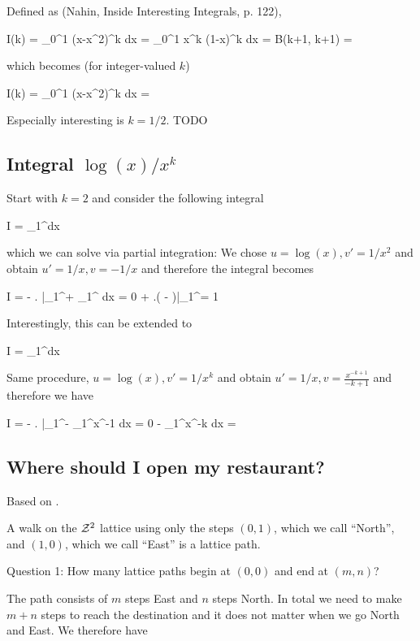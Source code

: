 Defined as (Nahin, Inside Interesting Integrals, p. 122),

\bee
I(k) = \int_0^1 (x-x^2)^k dx = \int_0^1 x^k (1-x)^k dx = B(k+1, k+1) = 
\eee

which becomes (for integer-valued $k$)

\bee
I(k) = \int_0^1 (x-x^2)^k dx = 
\eee

Especially interesting is $k =1/2$. TODO


\subsection{Integral $\log(x)/x^k$}

Start with $k = 2$ and consider the following integral

\bee
I = \int_1^\infty {}dx
\eee

which we can solve via partial integration: We chose $u=\log(x), v'=1/x^2$ and obtain $u' = 1/x, v = -1/x$ and therefore the integral becomes

\bee
I = - \left.  \right|_1^\infty + \int_1^\infty {} dx = 0 + \left.\left( -  \right)\right|_1^\infty = 1
\eee

Interestingly, this can be extended to

\bee
I = \int_1^\infty {}dx
\eee

Same procedure, $u=\log(x), v'=1/x^k$ and obtain $u' = 1/x, v = \frac{x^{-k+1}}{-k+1}$ and therefore we have

\bee
I = - \left.  \right|_1^\infty - \int_1^\infty x^{-1}  dx = 0 -  \int_1^\infty x^{-k} dx = 
\eee

\subsection{Where should I open my restaurant?}

Based on \cite{Kaplan2017}.

A walk on the $\mathcal{Z}^2$ lattice using only the steps $(0, 1)$, which we call ``North'', and $(1, 0)$, which we call ``East'' is a lattice path.

Question 1: How many lattice paths begin at $(0, 0)$ and end at $(m, n)$?

The path consists of $m$ steps East and $n$ steps North. In total we need to make $m+n$ steps to reach the destination and it does not matter when we go North and East. We therefore have

